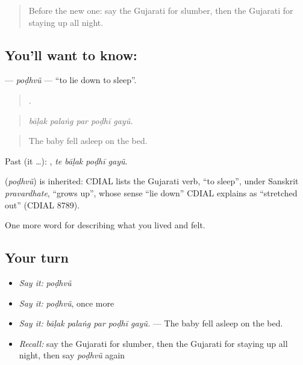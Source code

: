 \label{lesson:GU-C476-podhvu}



\begin{quote}
Before the new one: say the Gujarati for slumber, then the Gujarati for staying up all night.
\end{quote}

\subsection*{You'll want to know: }
\textbf{} — \emph{poḍhvũ} — \textquotedblleft{}to lie down to sleep\textquotedblright{}.

\begin{quote}
    .
\end{quote}

\begin{quote}
\emph{bāḷak palaṅg par poḍhī gayũ.}
\end{quote}

\begin{quote}
The baby fell asleep on the bed.
\end{quote}

Past (it …):    , \emph{te bāḷak poḍhī gayũ}.

\begin{cousinweb}
\textbf{} (\emph{poḍhvũ}) is inherited: CDIAL lists the Gujarati verb, \textquotedblleft{}to sleep\textquotedblright{}, under Sanskrit \emph{pravardhate}, \textquotedblleft{}grows up\textquotedblright{}, whose sense \textquotedblleft{}lie down\textquotedblright{} CDIAL explains as \textquotedblleft{}stretched out\textquotedblright{} (CDIAL 8789).
\end{cousinweb}

\begin{grammarlens}[title={What you've built}]
One more word for describing what you lived and felt.
\end{grammarlens}

\subsection*{Your turn}
\begin{itemize}
\raggedright
  \item \emph{Say it:} \emph{poḍhvũ}
  \item \emph{Say it:} \emph{poḍhvũ}, once more
  \item \emph{Say it:} \emph{bāḷak palaṅg par poḍhī gayũ.} — The baby fell asleep on the bed.
  \item \emph{Recall:} say the Gujarati for slumber, then the Gujarati for staying up all night, then say \emph{poḍhvũ} again
\end{itemize}

